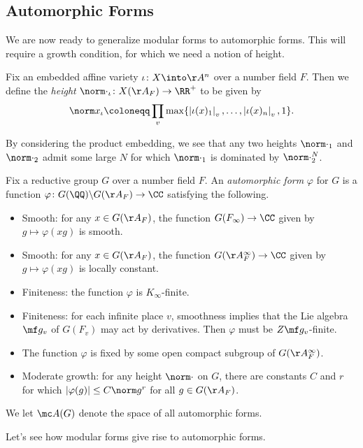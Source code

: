 \documentclass[../notes.tex]{subfiles}
\begin{document}
\subsection{Automorphic Forms}
We are now ready to generalize modular forms to automorphic forms. This will require a growth condition, for which we need a notion of height.
\begin{definition}[height]
	Fix an embedded affine variety $\iota\colon X\into\AA^n$ over a number field $F$. Then we define the \textit{height} $\norm\cdot_\iota\colon X(\AA_F)\to\RR^+$ to be given by
	\[\norm x_\iota\coloneqq\prod_v\max\{\left|\iota(x)_1\right|_v,\ldots,\left|\iota(x)_n\right|_v,1\}.\]
\end{definition}
\begin{remark}
	By considering the product embedding, we see that any two heights $\norm\cdot_1$ and $\norm\cdot_2$ admit some large $N$ for which $\norm\cdot_1$ is dominated by $\norm\cdot_2^N$.
\end{remark}
\begin{definition}
	Fix a reductive group $G$ over a number field $F$. An \textit{automorphic form} $\varphi$ for $G$ is a function $\varphi\colon G(\QQ)\backslash G(\AA_F)\to\CC$ satisfying the following.
	\begin{itemize}
		\item Smooth: for any $x\in G(\AA_F)$, the function $G(F_\infty)\to\CC$ given by $g\mapsto\varphi(xg)$ is smooth.
		\item Smooth: for any $x\in G(\AA_F)$, the function $G(\AA_F^\infty)\to\CC$ given by $g\mapsto\varphi(xg)$ is locally constant.
		\item Finiteness: the function $\varphi$ is $K_\infty$-finite.
		\item Finiteness: for each infinite place $v$, smoothness implies that the Lie algebra $\mf g_v$ of $G(F_v)$ may act by derivatives. Then $\varphi$ must be $Z\mf g_v$-finite.
		\item The function $\varphi$ is fixed by some open compact subgroup of $G(\AA_{F}^\infty)$.
		\item Moderate growth: for any height $\norm\cdot$ on $G$, there are constants $C$ and $r$ for which $\left|\varphi(g)\right|\le C\norm g^r$ for all $g\in G(\AA_F)$.
	\end{itemize}
	We let $\mc A(G)$ denote the space of all automorphic forms.
\end{definition}
Let's see how modular forms give rise to automorphic forms.
\end{document}
